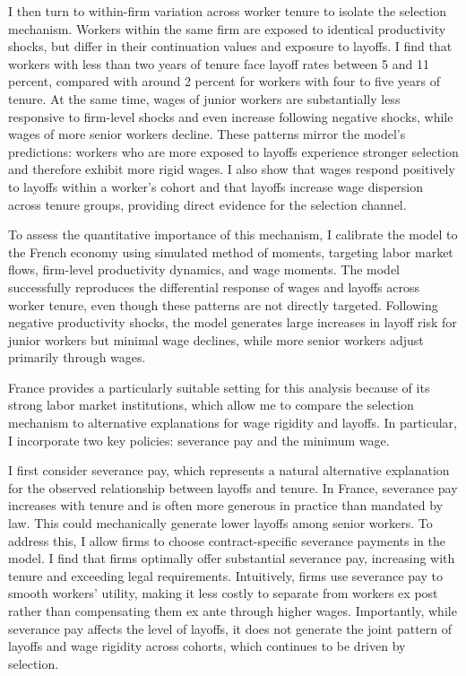 I then turn to within-firm variation across worker tenure to isolate the selection mechanism. Workers within the same firm are exposed to identical productivity shocks, but differ in their continuation values and exposure to layoffs. I find that workers with less than two years of tenure face layoff rates between 5 and 11 percent, compared with around 2 percent for workers with four to five years of tenure. At the same time, wages of junior workers are substantially less responsive to firm-level shocks and even increase following negative shocks, while wages of more senior workers decline. These patterns mirror the model’s predictions: workers who are more exposed to layoffs experience stronger selection and therefore exhibit more rigid wages. I also show that wages respond positively to layoffs within a worker’s cohort and that layoffs increase wage dispersion across tenure groups, providing direct evidence for the selection channel.

To assess the quantitative importance of this mechanism, I calibrate the model to the French economy using simulated method of moments, targeting labor market flows, firm-level productivity dynamics, and wage moments. The model successfully reproduces the differential response of wages and layoffs across worker tenure, even though these patterns are not directly targeted. Following negative productivity shocks, the model generates large increases in layoff risk for junior workers but minimal wage declines, while more senior workers adjust primarily through wages.

France provides a particularly suitable setting for this analysis because of its strong labor market institutions, which allow me to compare the selection mechanism to alternative explanations for wage rigidity and layoffs. In particular, I incorporate two key policies: severance pay and the minimum wage.

I first consider severance pay, which represents a natural alternative explanation for the observed relationship between layoffs and tenure. In France, severance pay increases with tenure and is often more generous in practice than mandated by law. This could mechanically generate lower layoffs among senior workers. To address this, I allow firms to choose contract-specific severance payments in the model. I find that firms optimally offer substantial severance pay, increasing with tenure and exceeding legal requirements. Intuitively, firms use severance pay to smooth workers’ utility, making it less costly to separate from workers ex post rather than compensating them ex ante through higher wages. Importantly, while severance pay affects the level of layoffs, it does not generate the joint pattern of layoffs and wage rigidity across cohorts, which continues to be driven by selection.

